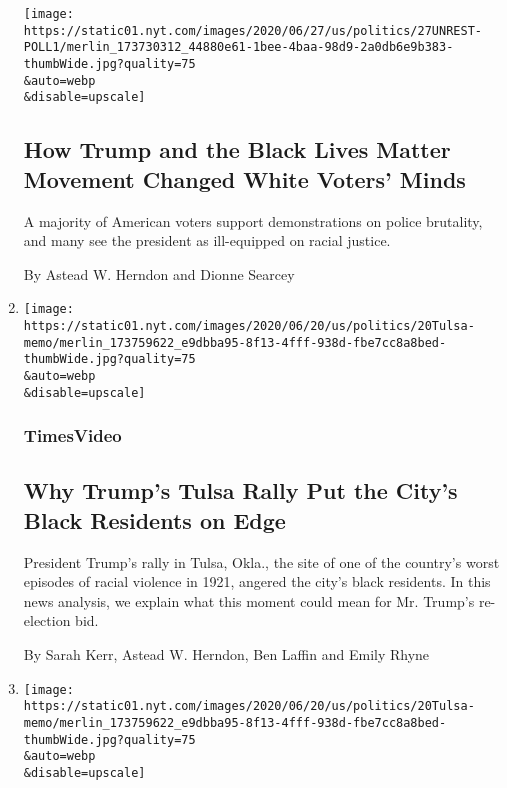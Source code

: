 \begin{enumerate}
  \texttt{[image: https://static01.nyt.com/images/2020/06/27/us/politics/27UNREST-POLL1/merlin\_173730312\_44880e61-1bee-4baa-98d9-2a0db6e9b383-thumbWide.jpg?quality=75\\\&auto=webp\\\&disable=upscale]}

  \hypertarget{how-trump-and-the-black-lives-matter-movement-changed-white-voters-minds}{%
  \subsection{How Trump and the Black Lives Matter Movement Changed
  White Voters'
  Minds}\label{how-trump-and-the-black-lives-matter-movement-changed-white-voters-minds}}

  A majority of American voters support demonstrations on police
  brutality, and many see the president as ill-equipped on racial
  justice.

  By Astead W. Herndon and Dionne Searcey
\item
  \href{/video/us/100000007188759/trump-rally-juneteenth-tulsa-oklahoma.html}{}

  \texttt{[image: https://static01.nyt.com/images/2020/06/20/us/politics/20Tulsa-memo/merlin\_173759622\_e9dbba95-8f13-4fff-938d-fbe7cc8a8bed-thumbWide.jpg?quality=75\\\&auto=webp\\\&disable=upscale]}

  \hypertarget{timesvideo}{%
  \subsubsection{TimesVideo}\label{timesvideo}}

  \hypertarget{why-trumps-tulsa-rally-put-the-citys-black-residents-on-edge}{%
  \subsection{Why Trump's Tulsa Rally Put the City's Black Residents on
  Edge}\label{why-trumps-tulsa-rally-put-the-citys-black-residents-on-edge}}

  President Trump's rally in Tulsa, Okla., the site of one of the
  country's worst episodes of racial violence in 1921, angered the
  city's black residents. In this news analysis, we explain what this
  moment could mean for Mr. Trump's re-election bid.

  By Sarah Kerr, Astead W. Herndon, Ben Laffin and Emily Rhyne
\item
  \href{/2020/06/21/us/politics/trump-rally-supporters.html}{}

  \texttt{[image: https://static01.nyt.com/images/2020/06/20/us/politics/20Tulsa-memo/merlin\_173759622\_e9dbba95-8f13-4fff-938d-fbe7cc8a8bed-thumbWide.jpg?quality=75\\\&auto=webp\\\&disable=upscale]}


\end{enumerate}
